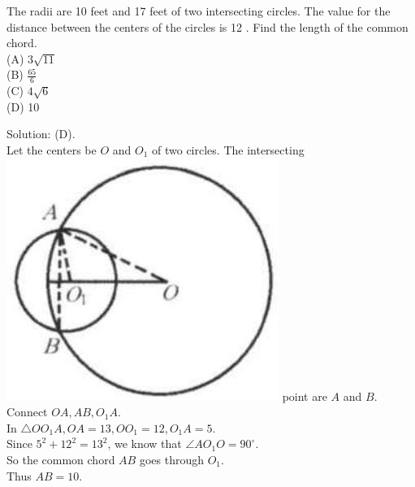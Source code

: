 \documentclass{article}
\begin{document}
The radii are 10 feet and 17 feet of two intersecting circles. The value for the distance between the centers of the circles is 12 . Find the length of the common chord.\\
(A) \(3 \sqrt{11}\)\\
(B) \(\frac{65}{6}\)\\
(C) \(4 \sqrt{6}\)\\
(D) 10

Solution: (D).\\
Let the centers be \(O\) and \(O_{1}\) of two circles. The intersecting\\
\includegraphics[width=\textwidth]{images/178.jpg} point are \(A\) and \(B\). Connect \(O A, A B, O_{1} A\).\\
In \(\triangle O O_{1} A, O A=13, O O_{1}=12, O_{1} A=5\).\\
Since \(5^{2}+12^{2}=13^{2}\), we know that \(\angle A O_{1} O=90^{\circ}\).\\
So the common chord \(A B\) goes through \(O_{1}\).\\
Thus \(A B=10\).
\end{document}
